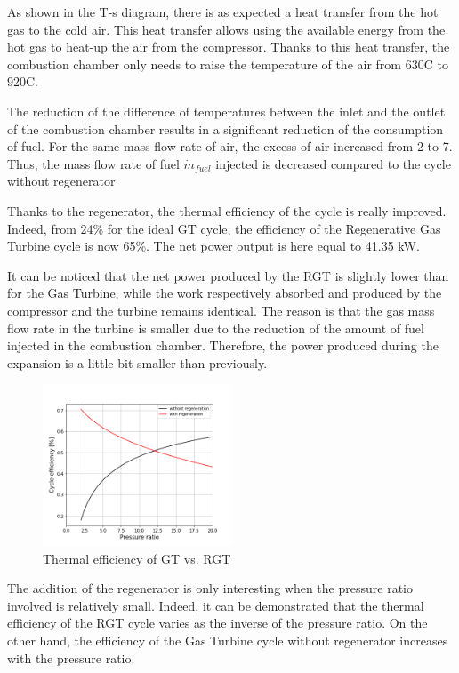 As shown in the T-s diagram, there is as expected a heat transfer from the hot gas to the cold air. This heat transfer allows using the available energy from the hot gas to heat-up the air from the compressor. Thanks to this heat transfer, the combustion chamber only needs to raise the temperature of the air from 630\degree C to 920\degree C. 

The reduction of the difference of temperatures between the inlet and the outlet of the combustion chamber results in a significant reduction of the consumption of fuel. For the same mass flow rate of air, the excess of air increased from 2 to 7. Thus, the mass flow rate of fuel $\dot{m}_{fuel}$ injected is decreased compared to the cycle without regenerator  

Thanks to the regenerator, the thermal efficiency of the cycle is really improved. Indeed, from 24\% for the ideal GT cycle, the efficiency of the Regenerative Gas Turbine cycle is now 65\%. The net power output is here equal to 41.35 kW. 

It can be noticed that the net power produced by the RGT is slightly lower than for the Gas Turbine, while the work respectively absorbed and produced by the compressor and the turbine remains identical. The reason is that the gas mass flow rate in the turbine is smaller due to the reduction of the amount of fuel injected in the combustion chamber. Therefore, the power produced during the expansion is a little bit smaller than previously.

\begin{figure}[h]
    \centering
    \includegraphics[width=0.5\textwidth]{Chapitre_5/Images/Efficiency_ideal_Brayton_regen.png}
    \caption{Thermal efficiency of GT vs. RGT}
    \label{fig:C5_eff_RGT-GT}
\end{figure}

The addition of the regenerator is only interesting when the pressure ratio involved is relatively small. Indeed, it can be demonstrated that the thermal efficiency of the RGT cycle varies as the inverse of the pressure ratio. On the other hand, the efficiency of the Gas Turbine cycle without regenerator increases with the pressure ratio. 

